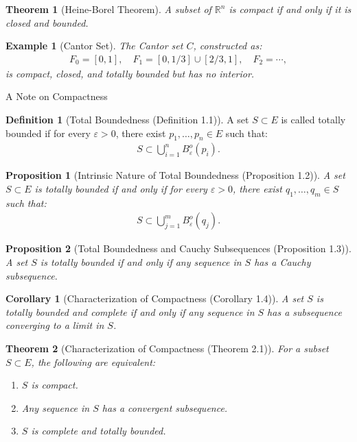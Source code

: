 \documentclass[7pt]{article}
\theoremstyle{definition}
\newtheorem{definition}{Definition}
\theoremstyle{plain}
\newtheorem{theorem}{Theorem}
\newtheorem{proposition}{Proposition}
\newtheorem{example}{Example}
\newtheorem{corollary}{Corollary}
\begin{document}
\begin{theorem}[Heine-Borel Theorem]
A subset of $ \mathbb{R}^n $ is compact if and only if it is closed and bounded.
\end{theorem}

\begin{example}[Cantor Set]
The Cantor set $ C $, constructed as:
\begin{align}
F_0 = [0, 1], \quad F_1 = [0, 1/3] \cup [2/3, 1], \quad F_2 = \cdots,
\end{align}
is compact, closed, and totally bounded but has no interior.
\end{example}
{A Note on Compactness}

\begin{definition}[Total Boundedness (Definition 1.1)]
A set $ S \subset E $ is called totally bounded if for every $ \varepsilon > 0 $, there exist $ p_1, \ldots, p_n \in E $ such that:
\begin{align}
S \subset \bigcup_{i=1}^n B_\varepsilon^o(p_i).
\end{align}
\end{definition}

\begin{proposition}[Intrinsic Nature of Total Boundedness (Proposition 1.2)]
A set $ S \subset E $ is totally bounded if and only if for every $ \varepsilon > 0 $, there exist $ q_1, \ldots, q_m \in S $ such that:
\begin{align}
S \subset \bigcup_{j=1}^m B_\varepsilon^o(q_j).
\end{align}
\end{proposition}

\begin{proposition}[Total Boundedness and Cauchy Subsequences (Proposition 1.3)]
A set $ S $ is totally bounded if and only if any sequence in $ S $ has a Cauchy subsequence.
\end{proposition}

\begin{corollary}[Characterization of Compactness (Corollary 1.4)]
A set $ S $ is totally bounded and complete if and only if any sequence in $ S $ has a subsequence converging to a limit in $ S $.
\end{corollary}

\begin{theorem}[Characterization of Compactness (Theorem 2.1)]
For a subset $ S \subset E $, the following are equivalent:
\begin{enumerate}
    \item $ S $ is compact.
    \item Any sequence in $ S $ has a convergent subsequence.
    \item $ S $ is complete and totally bounded.
\end{enumerate}
\end{theorem}
\end{document}

